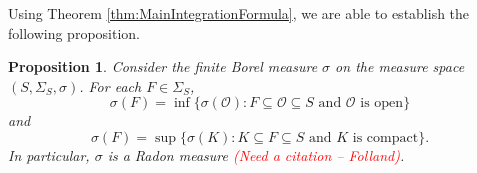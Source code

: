 \documentclass[11pt]{article}
\theoremstyle{theorem}
\newtheorem{proposition}[theorem]{Proposition}
\begin{document}
\noindent Using Theorem \ref{thm:MainIntegrationFormula}, we are able to establish the following proposition. 

\begin{proposition}\label{prop:Regular}
Consider the finite Borel measure $\sigma$ on the measure space $(S,\Sigma_S,\sigma)$. For each $F\in\Sigma_S$,
\begin{equation}\label{eq:OuterRegular}
\sigma(F)=\inf\{\sigma(\mathcal{O}):F\subseteq\mathcal{O}\subseteq S\mbox{ and $\mathcal{O}$ is open}\}
\end{equation}
and
\begin{equation}
\sigma(F)=\sup\{\sigma(K):K\subseteq F\subseteq S\mbox{ and $K$ is compact}\}.
\end{equation}
In particular, $\sigma$ is a Radon measure \textcolor{red}{(Need a citation -- Folland)}.
\end{proposition}
\end{document}
